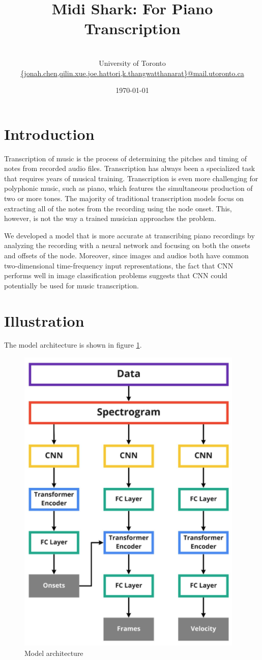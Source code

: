 \documentclass[a4paper,twocolumn,10pt]{article}
\title{\vspace{-50pt}\bfseries{\Large{Midi Shark: For Piano Transcription}}}
\author{\normalfont{Jonah Chen, QiLin Xue, Joe Hattori, Khanatat Thangwatthanarat}\\\small{University of Toronto}\\\vspace{-10pt}\small{\url{{jonah.chen,qilin.xue,joe.hattori,k.thangwatthanarat}@mail.utoronto.ca}}}
\date{\today}
\begin{document}
\maketitle
\section{Introduction}
Transcription of music is the process of determining the pitches and timing of notes from recorded audio files. Transcription has always been a specialized task that requires years of musical training. Transcription is even more challenging for polyphonic music, such as piano, which features the simultaneous production of two or more tones. The majority of traditional transcription models focus on extracting all of the notes from the recording using the node onset. This, however, is not the way a trained musician approaches the problem\cite{intro}.

We developed a model that is more accurate at transcribing piano recordings by analyzing the recording with a neural network and focusing on both the onsets and offsets of the node. Moreover, since images and audios both have common two-dimensional time-frequency input representations, the fact that CNN performs well in image classification problems suggests that CNN could potentially be used for music transcription\cite{onsets_and_frames}.

\section{Illustration}
The model architecture is shown in figure \ref{fig:architecture}.
\begin{figure}[h!]
  \centering
  \includegraphics[width=0.7\linewidth]{figures/architecture.png}
  \caption{Model architecture}
  \label{fig:architecture}
\end{figure}
\end{document}
